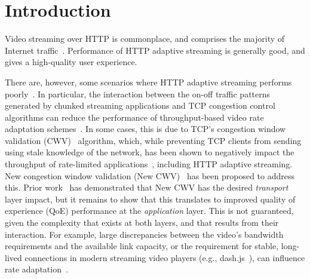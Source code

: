 \documentclass[10pt,sigconf]{acmart}
\begin{document}
\section{Introduction}
\label{sec:introduction}

%

Video streaming over HTTP is commonplace, and comprises the majority of Internet traffic~\cite{Sandvine-2019-global-internet-report}. Performance of HTTP adaptive streaming is generally good, and gives a high-quality user experience.
  
There are, however, some scenarios where HTTP adaptive streaming performs poorly~\cite{Spiteri-2016-BOLA,Kua-2017-a-survey-rate-adaptation-dash}. In particular, the interaction between the on-off traffic patterns generated by chunked streaming applications and TCP congestion control algorithms can reduce the performance of throughput-based video rate adaptation schemes~\cite{Akhshabi-2012-http-adaptive-players-compete,Stohr-2017-where-are-the-sweet-spots-maci}. In some cases, this is due to TCP's congestion window validation (CWV)~\cite{rfc2861-2000-padhye-congestion-window-validation} algorithm, which, while preventing TCP clients from sending using stale knowledge of the network, has been shown to negatively impact the throughput of rate-limited applications~\cite{Nazir-2014-performance-evaluation-congestion-window-validation-dash-newcwv}, including HTTP adaptive streaming. New congestion window validation (New CWV)~\cite{rfc7661-2015-fairhurst-new-cwnd-validation} has been proposed to address this. Prior work~\cite{Nazir-2014-performance-evaluation-congestion-window-validation-dash-newcwv} has demonstrated that New CWV has the desired \emph{transport} layer impact, but it remains to show that this translates to improved quality of experience (QoE) performance at the \emph{application} layer. This is not guaranteed, given the complexity that exists at both layers, and that results from their interaction. For example, large discrepancies between the video's bandwidth requirements and the available link capacity, or the requirement for stable, long-lived connections in modern streaming video players (e.g., dash.js~\cite{online-dashjs}), can influence rate adaptation~\cite{Spiteri-2019-from-theory-to-practice-sabre}.
\end{document}
